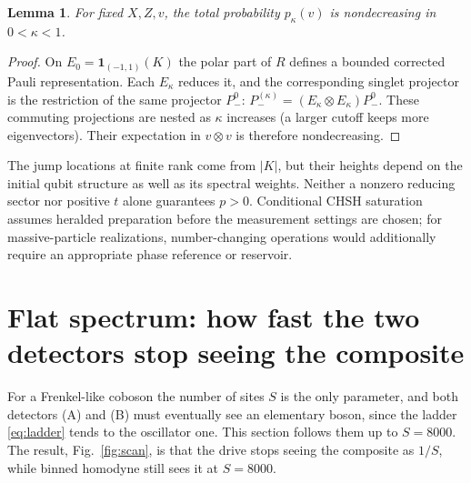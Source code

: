 \documentclass[11pt,a4paper]{article}
\newtheorem{lemma}{Lemma}
\begin{document}
\begin{lemma}
\label{lem:cutoff}
For fixed $X,Z,v$, the total probability $p_\kappa(v)$ is nondecreasing in $0<\kappa<1$.
\end{lemma}
\begin{proof}
On $E_0=\mathbf1_{(-1,1)}(K)$ the polar part of $R$ defines a bounded corrected Pauli representation. Each $E_\kappa$ reduces it, and the corresponding singlet projector is the restriction of the same projector $P_-^0$:
$P_-^{(\kappa)}=(E_\kappa\otimes E_\kappa)P_-^0$. These commuting projections are nested as $\kappa$ increases (a larger cutoff keeps more eigenvectors). Their expectation in $v\otimes v$ is therefore nondecreasing.
\end{proof}
The jump locations at finite rank come from $|K|$, but their heights depend on the initial qubit structure as well as its spectral weights. Neither a nonzero reducing sector nor positive $t$ alone guarantees $p>0$. Conditional CHSH saturation assumes heralded preparation before the measurement settings are chosen; for massive-particle realizations, number-changing operations would additionally require an appropriate phase reference or reservoir.

\section{Flat spectrum: how fast the two detectors stop seeing the composite}
\label{sec:finite}

For a Frenkel-like coboson the number of sites $S$ is the only parameter, and both detectors (A) and (B) must eventually see an elementary boson, since the ladder \eqref{eq:ladder} tends to the oscillator one. This section follows them up to $S=8000$. The result, Fig.~\ref{fig:scan}, is that the drive stops seeing the composite as $1/S$, while binned homodyne still sees it at $S=8000$.
\end{document}
